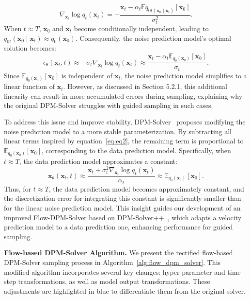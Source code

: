 \begin{equation}
  \nabla_{\mathbf{x}_t} \log q_t(\mathbf{x}_t) = -\frac{\mathbf{x}_t - \alpha_t \mathbb{E}{q_{0t(\mathbf{x}_0 \mid \mathbf{x}_t)}}[\mathbf{x}_0]}{\sigma_t^2}.
  \label{eq:eq1}
\end{equation}
When $t \approx T$, $\mathbf{x}_0$ and $\mathbf{x}_t$ become conditionally independent, leading to $q_{0t}(\mathbf{x}_0 \mid \mathbf{x}_t) \approx q_0(\mathbf{x}_0)$. Consequently, the noise prediction model’s optimal solution becomes:
\begin{equation}
  \epsilon_\theta(\mathbf{x}_t, t) \approx -\sigma_t \nabla_{\mathbf{x}_t} \log q_t(\mathbf{x}_t) \approx \frac{\mathbf{x}_t - \alpha_t \mathbb{E}_{q_0(\mathbf{x}_0)}[\mathbf{x}_0]}{\sigma_t}.
  \label{eq:eq2}
\end{equation}
Since $\mathbb{E}_{q_0(\mathbf{x}_0)}[\mathbf{x}_0]$ is independent of $\mathbf{x}_t$, the noise prediction model simplifies to a linear function of $\mathbf{x}_t$. However, as discussed in Section 5.2.1, this additional linearity can result in more accumulated errors during sampling, explaining why the original DPM-Solver struggles with guided sampling in such cases.

To address this issue and improve stability, DPM-Solver~\citep{lu2022dpm} proposes modifying the noise prediction model to a more stable parameterization. By subtracting all linear terms inspired by equation~\ref{eq:eq2}, the remaining term is proportional to $\mathbb{E}_{q_0(\mathbf{x}_0)}[\mathbf{x}_0]$, corresponding to the data prediction model. Specifically, when $t \approx T$, the data prediction model approximates a constant:
\begin{equation}
  \mathbf{x}_\theta(\mathbf{x}_t, t) \approx \frac{\mathbf{x}_t + \sigma_t^2 \nabla_{\mathbf{x}_t} \log q_t(\mathbf{x}_t)}{\alpha_t} \approx \mathbb{E}_{q_0(\mathbf{x}_0)}[\mathbf{x}_0].
  \label{eq:eq3}
\end{equation}
Thus, for $t \approx T$, the data prediction model becomes approximately constant, and the discretization error for integrating this constant is significantly smaller than for the linear noise prediction model. This insight guides our development of an improved Flow-DPM-Solver based on DPM-Solver++~\citep{lu2022dpm_add}, which adapts a velocity prediction model \model{} to a data prediction one, enhancing performance for guided sampling.

\noindent \textbf{Flow-based DPM-Solver Algorithm.}
We present the rectified flow-based DPM-Solver sampling process in Algorithm~\ref{alg:flow_dpm_solver}. This modified algorithm incorporates several key changes: hyper-parameter and time-step transformations, as well as model output transformations. These adjustments are highlighted in blue to differentiate them from the original solver.

